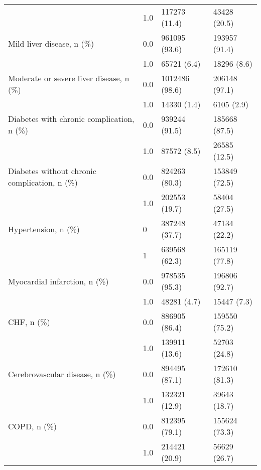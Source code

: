 \begin{tabular}{llll}
                                       & 1.0 &                         117273 (11.4) &      43428 (20.5) \\
Mild liver disease, n (\%) & 0.0 &                         961095 (93.6) &     193957 (91.4) \\
                                       & 1.0 &                           65721 (6.4) &       18296 (8.6) \\
Moderate or severe liver disease, n (\%) & 0.0 &                        1012486 (98.6) &     206148 (97.1) \\
                                       & 1.0 &                           14330 (1.4) &        6105 (2.9) \\
Diabetes with chronic complication, n (\%) & 0.0 &                         939244 (91.5) &     185668 (87.5) \\
                                       & 1.0 &                           87572 (8.5) &      26585 (12.5) \\
Diabetes without chronic complication, n (\%) & 0.0 &                         824263 (80.3) &     153849 (72.5) \\
                                       & 1.0 &                         202553 (19.7) &      58404 (27.5) \\
Hypertension, n (\%) & 0 &                         387248 (37.7) &      47134 (22.2) \\
                                       & 1 &                         639568 (62.3) &     165119 (77.8) \\
Myocardial infarction, n (\%) & 0.0 &                         978535 (95.3) &     196806 (92.7) \\
                                       & 1.0 &                           48281 (4.7) &       15447 (7.3) \\
CHF, n (\%) & 0.0 &                         886905 (86.4) &     159550 (75.2) \\
                                       & 1.0 &                         139911 (13.6) &      52703 (24.8) \\
Cerebrovascular disease, n (\%) & 0.0 &                         894495 (87.1) &     172610 (81.3) \\
                                       & 1.0 &                         132321 (12.9) &      39643 (18.7) \\
COPD, n (\%) & 0.0 &                         812395 (79.1) &     155624 (73.3) \\
                                       & 1.0 &                         214421 (20.9) &      56629 (26.7) \\

\end{tabular}
